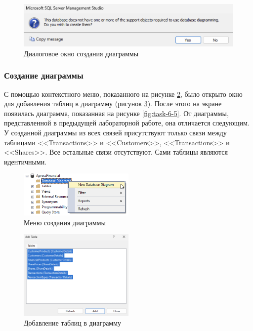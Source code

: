 \documentclass[a4paper, 14pt]{extarticle}
\begin{document}
\begin{figure}[H]
  \centering
  \includegraphics[width=\textwidth]{images/task-6/2.png}
  \caption{Диалоговое окно создания диаграммы}
  \label{fig:task-6-2}
\end{figure}

\subsubsection{Создание диаграммы}

С помощью контекстного меню, показанного на рисунке \ref{fig:task-6-3}, было
открыто окно для добавления таблиц в диаграмму (рисунок \ref{fig:task-6-4}).
После этого на экране появилась диаграмма, показанная на рисунке
\ref{fig:task-6-5}. От диаграммы, представленной в предыдущей лабораторной
работе, она отличается следующим. У созданной диаграммы из всех связей
присутствуют только связи между таблицами
<<\foreignlanguage{english}{Transactions}>> и
<<\foreignlanguage{english}{Customers}>>,
<<\foreignlanguage{english}{Transactions}>> и
<<\foreignlanguage{english}{Shares}>>. Все остальные связи отсутствуют. Сами
таблицы являются идентичными.

\begin{figure}[H]
  \centering
  \includegraphics[width=0.5\textwidth]{images/task-6/3.png}
  \caption{Меню создания диаграммы}
  \label{fig:task-6-3}
\end{figure}

\begin{figure}[H]
  \centering
  \includegraphics[width=0.5\textwidth]{images/task-6/4.png}
  \caption{Добавление таблиц в диаграмму}
  \label{fig:task-6-4}
\end{figure}
\end{document}
